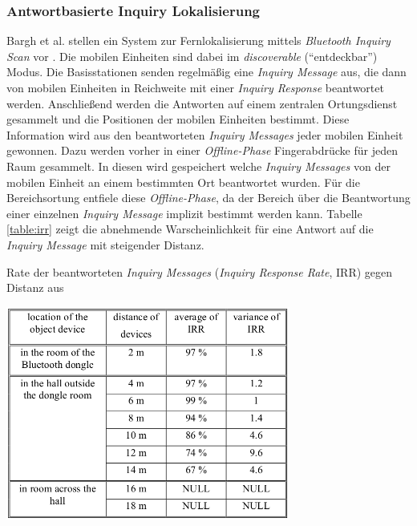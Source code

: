 \subsubsection{Antwortbasierte Inquiry Lokalisierung}
\label{ch:Vorherige:sec:irr}
Bargh et al. stellen ein System zur Fernlokalisierung mittels \emph{Bluetooth Inquiry Scan} vor \cite{bargh2008indoor}.
Die mobilen Einheiten sind dabei im \emph{discoverable} ("`entdeckbar"') Modus.
Die Basisstationen senden regelmäßig eine \emph{Inquiry Message} aus, die dann von mobilen Einheiten in Reichweite mit einer \emph{Inquiry Response} beantwortet werden. 
Anschließend werden die Antworten auf einem zentralen Ortungsdienst gesammelt und die Positionen der mobilen Einheiten bestimmt.
Diese Information wird aus den beantworteten \emph{Inquiry Messages} jeder mobilen Einheit gewonnen.
Dazu werden vorher in einer \emph{Offline-Phase} Fingerabdrücke für jeden Raum gesammelt.
In diesen wird gespeichert welche \emph{Inquiry Messages} von der mobilen Einheit an einem bestimmten Ort beantwortet wurden.
Für die Bereichsortung entfiele diese \emph{Offline-Phase}, da der Bereich über die Beantwortung einer einzelnen \emph{Inquiry Message} implizit bestimmt werden kann.
Tabelle \ref{table:irr} zeigt die abnehmende Warscheinlichkeit für eine Antwort auf die \emph{Inquiry Message} mit steigender Distanz.

\begin{table}[h]
  \centering
  \caption{Rate der beantworteten \emph{Inquiry Messages} (\emph{Inquiry Response Rate}, IRR) gegen Distanz aus \cite{bargh2008indoor}}
	\includegraphics[width=0.7\textwidth]{images/irr.png}

  \label{table:irr}
\end{table}

